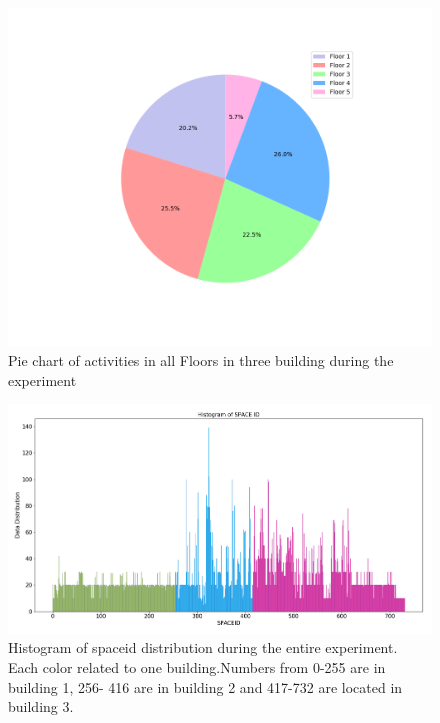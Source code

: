 \documentclass[../UNBThesis2.tex]{subfiles}
\begin{document}


\begin{figure}
    \centering
    \includegraphics[width = 12 cm]{image/Chapters/Chapter6/floors.png}
    \caption{Pie chart of activities in all Floors in three building during the experiment }
    \label{Pfloor}
\end{figure}





\begin{figure}
    \centering
    \includegraphics[width = 16 cm]{image/Chapters/Chapter6/uniqspaceid.png}
    \caption{Histogram of spaceid distribution during the entire experiment. Each color related to one building.Numbers from 0-255 are in building 1, 256- 416 are in building 2 and 417-732 are located in building 3.}
    \label{spaceiduniq }
\end{figure}
\end{document}

